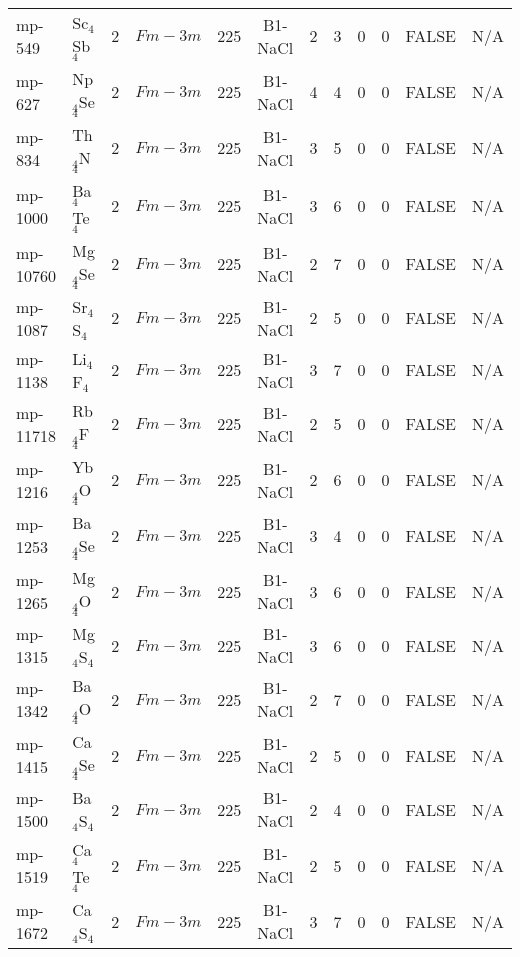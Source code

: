 {\begin{longtable}{llcccccccccc}
    mp-549 & Sc$_{4}$Sb$_{4}$ & 2     & $Fm-3m$ & 225   & B1-NaCl & 2     & 3     & 0     & 0     & FALSE & N/A \\
    mp-627 & Np$_{4}$Se$_{4}$ & 2     & $Fm-3m$ & 225   & B1-NaCl & 4     & 4     & 0     & 0     & FALSE & N/A \\
    mp-834 & Th$_{4}$N$_{4}$ & 2     & $Fm-3m$ & 225   & B1-NaCl & 3     & 5     & 0     & 0     & FALSE & N/A \\
    mp-1000 & Ba$_{4}$Te$_{4}$ & 2     & $Fm-3m$ & 225   & B1-NaCl & 3     & 6     & 0     & 0     & FALSE & N/A \\
    mp-10760 & Mg$_{4}$Se$_{4}$ & 2     & $Fm-3m$ & 225   & B1-NaCl & 2     & 7     & 0     & 0     & FALSE & N/A \\
    mp-1087 & Sr$_{4}$S$_{4}$ & 2     & $Fm-3m$ & 225   & B1-NaCl & 2     & 5     & 0     & 0     & FALSE & N/A \\
    mp-1138 & Li$_{4}$F$_{4}$ & 2     & $Fm-3m$ & 225   & B1-NaCl & 3     & 7     & 0     & 0     & FALSE & N/A \\
    mp-11718 & Rb$_{4}$F$_{4}$ & 2     & $Fm-3m$ & 225   & B1-NaCl & 2     & 5     & 0     & 0     & FALSE & N/A \\
    mp-1216 & Yb$_{4}$O$_{4}$ & 2     & $Fm-3m$ & 225   & B1-NaCl & 2     & 6     & 0     & 0     & FALSE & N/A \\
    mp-1253 & Ba$_{4}$Se$_{4}$ & 2     & $Fm-3m$ & 225   & B1-NaCl & 3     & 4     & 0     & 0     & FALSE & N/A \\
    mp-1265 & Mg$_{4}$O$_{4}$ & 2     & $Fm-3m$ & 225   & B1-NaCl & 3     & 6     & 0     & 0     & FALSE & N/A \\
    mp-1315 & Mg$_{4}$S$_{4}$ & 2     & $Fm-3m$ & 225   & B1-NaCl & 3     & 6     & 0     & 0     & FALSE & N/A \\
    mp-1342 & Ba$_{4}$O$_{4}$ & 2     & $Fm-3m$ & 225   & B1-NaCl & 2     & 7     & 0     & 0     & FALSE & N/A \\
    mp-1415 & Ca$_{4}$Se$_{4}$ & 2     & $Fm-3m$ & 225   & B1-NaCl & 2     & 5     & 0     & 0     & FALSE & N/A \\
    mp-1500 & Ba$_{4}$S$_{4}$ & 2     & $Fm-3m$ & 225   & B1-NaCl & 2     & 4     & 0     & 0     & FALSE & N/A \\
    mp-1519 & Ca$_{4}$Te$_{4}$ & 2     & $Fm-3m$ & 225   & B1-NaCl & 2     & 5     & 0     & 0     & FALSE & N/A \\
    mp-1672 & Ca$_{4}$S$_{4}$ & 2     & $Fm-3m$ & 225   & B1-NaCl & 3     & 7     & 0     & 0     & FALSE & N/A \\

\end{longtable}}
